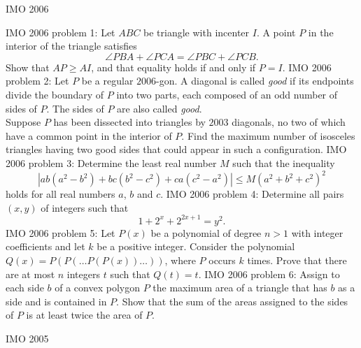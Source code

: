 IMO 2006 

IMO 2006 problem 1:  Let $ABC$ be triangle with incenter $I$. A point $P$ in the interior of the triangle satisfies
\[ \angle PBA+\angle PCA = \angle PBC+\angle PCB. \]
Show that $AP \geq AI$, and that equality holds if and only if $P=I$. 
IMO 2006 problem 2:  Let $P$ be a regular $2006$-gon. A diagonal is called \textit{good} if its endpoints divide the boundary of $P$ into two parts, each composed of an odd number of sides of $P$. The sides of $P$ are also called \textit{good}. \\
Suppose $P$ has been dissected into triangles by $2003$ diagonals, no two of which have a common point in the interior of $P$. Find the maximum number of isosceles triangles having two good sides that could appear in such a configuration. 
IMO 2006 problem 3:  Determine the least real number $M$ such that the inequality
\[ |ab(a^2-b^2)+bc(b^2-c^2)+ca(c^2-a^2)| \leq M(a^2+b^2+c^2)^2 \]
holds for all real numbers $a$, $b$ and $c$. 
IMO 2006 problem 4:  Determine all pairs $(x, y)$ of integers such that
\[ 1+2^x+2^{2x+1}= y^2. \] 
IMO 2006 problem 5:  Let $P(x)$ be a polynomial of degree $n > 1$ with integer coefficients and let $k$ be a positive integer. Consider the polynomial $Q(x) = P(P(\ldots P(P(x)) \ldots ))$, where $P$ occurs $k$ times. Prove that there are at most $n$ integers $t$ such that $Q(t) = t$. 
IMO 2006 problem 6:  Assign to each side $b$ of a convex polygon $P$ the maximum area of a triangle that has $b$ as a side and is contained in $P$. Show that the sum of the areas assigned to the sides of $P$ is at least twice the area of $P$. 

IMO 2005 

